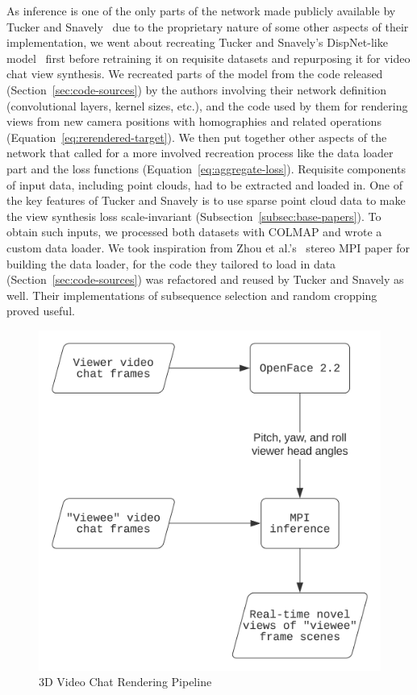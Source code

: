 As inference is one of the only parts of the network made publicly available by Tucker and Snavely~\cite{single_view_mpi} due to the proprietary nature of some other aspects of their implementation, we went about recreating Tucker and Snavely's DispNet-like model~\cite{mayer_large_2016} first before retraining it on requisite datasets and repurposing it for video chat view synthesis. We recreated parts of the model from the code released (Section~\ref{sec:code-sources}) by the authors involving their network definition (convolutional layers, kernel sizes, etc.), and the code used by them for rendering views from new camera positions with homographies and related operations (Equation~\ref{eq:rerendered-target}). We then put together other aspects of the network that called for a more involved recreation process like the data loader part and the loss functions (Equation~\ref{eq:aggregate-loss}). Requisite components of input data, including point clouds, had to be extracted and loaded in. One of the key features of Tucker and Snavely is to use sparse point cloud data to make the view synthesis loss scale-invariant (Subsection~\ref{subsec:base-papers}). To obtain such inputs, we processed both datasets with COLMAP and wrote a custom data loader. We took inspiration from Zhou et al.'s~\cite{zhou2018stereo} stereo MPI paper for building the data loader, for the code they tailored to load in data (Section~\ref{sec:code-sources}) was refactored and reused by Tucker and Snavely as well. Their implementations of subsequence selection and random cropping proved useful.

\begin{figure}[!h]
    \includegraphics[width=0.60\columnwidth]{figures/3d-video-chat-rendering-pipeline.png}
    \caption{3D Video Chat Rendering Pipeline}
    \label{fig:3d-video-chat-rendering-pipeline}
\end{figure}

